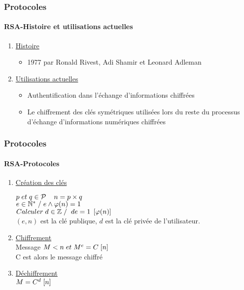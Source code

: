 \documentclass[10pt]{beamer}
\begin{document}
\begin{frame}
\frametitle{Protocoles}
\framesubtitle{RSA-Histoire et utilisations actuelles}
\begin{enumerate}
\item \underline{Histoire}
\begin{itemize}
\item 1977 par Ronald Rivest, Adi Shamir et Leonard Adleman
\end{itemize}
\item \underline{Utilisations actuelles}
\begin{itemize}
\item Authentification dans l'échange d'informations chiffrées
\item Le chiffrement des clés symétriques utilisées lors du reste du processus d'échange d'informations numériques chiffrées
\end{itemize}
\end{enumerate}
\end{frame}

\begin{frame}
\frametitle{Protocoles}
\framesubtitle{RSA-Protocoles}
\begin{enumerate}
\item \underline{Création des clés}

$ p \hspace{0.1cm} et \hspace{0.1cm} q \in \mathcal{P} \hspace{0.4cm} n=p\times q$\\
$ e \in \mathbb{N}^{*}\hspace{0.1cm} / \hspace{0.1cm} e\wedge  \varphi(n)=1$\\
$Calculer \hspace{0.1cm} d \in \mathbb{Z}\hspace{0.1cm}/\hspace{0.1cm}\hspace{0.1cm}de=1\hspace{0.1cm}\left[\varphi(n)\right]$\\
$(e,n)$ est la clé publique, $d$ est la clé privée de l'utilisateur.
\item \underline{Chiffrement}\\
Message \hspace{0.1cm} $M<n \hspace{0.1cm} et \hspace{0.1cm} M^{e}=C\hspace{0.1cm}[n]$\\
C est alors le message chiffré
\item \underline{Déchiffrement}\\
$M=C^{d}\hspace{0.1cm}[n]$
\end{enumerate}
\end{frame}
\end{document}
